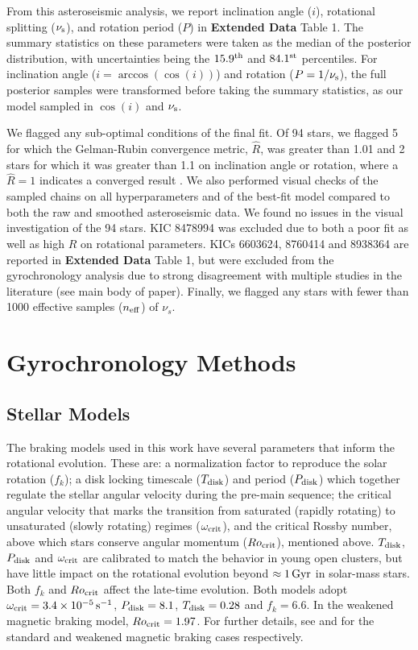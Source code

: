 From this asteroseismic analysis, we report inclination angle ($i$), rotational splitting ($\nu_{\rm s}$), and rotation period ($P$) in \textbf{Extended Data} Table 1. The summary statistics on these parameters were taken as the median of the posterior distribution, with uncertainties being the $15.9^{\rm th}$ and $84.1^{\rm st}$ percentiles. For inclination angle ($i = \arccos(\cos(i))$) and rotation ($P = 1/\nu_{\rm s}$), the full posterior samples were transformed before taking the summary statistics, as our model sampled in $\cos(i)$ and $\nu_{\rm s}$.

We flagged any sub-optimal conditions of the final fit. Of 94 stars, we flagged 5 for which the Gelman-Rubin convergence metric, $\hat{R}$, was greater than 1.01 and 2 stars for which it was greater than 1.1 on inclination angle or rotation, where a $\hat{R} = 1$ indicates a converged result \cite{gelman+rubin1992}. We also performed visual checks of the sampled chains on all hyperparameters and of the best-fit model compared to both the raw and smoothed asteroseismic data. We found no issues in the visual investigation of the 94 stars. KIC 8478994 was excluded due to both a poor fit as well as high $\hat{R}$ on rotational parameters. KICs 6603624, 8760414 and 8938364 are reported in \textbf{Extended Data} Table 1, but were excluded from the gyrochronology analysis due to strong disagreement with multiple studies in the literature (see main body of paper). Finally, we flagged any stars with fewer than 1000 effective samples ($n_{\rm eff}$) of $\nu_s$.


\section{Gyrochronology Methods}\label{s:gyro}
\subsection{Stellar Models}\label{ssec:models}
The braking models used in this work have several parameters that inform the rotational evolution. These are: a normalization factor to reproduce the solar rotation ($f_k$); a disk locking timescale ($T_{\rm disk}$) and period ($P_{\rm disk}$) which together regulate the stellar angular velocity during the pre-main sequence; the critical angular velocity that marks the transition from saturated (rapidly rotating) to unsaturated (slowly rotating) regimes ($\omega_{\rm crit}$), and the critical Rossby number, above which stars conserve angular momentum ($Ro_{\rm crit}$), mentioned above. $T_{\rm disk}$, $P_{\rm disk}$ and $\omega_{\rm crit}$ are calibrated to match the behavior in young open clusters, but have little impact on the rotational evolution beyond $\approx 1\, \rm{Gyr}$ in solar-mass stars. Both $f_k$ and $Ro_{\rm crit}$ affect the late-time evolution. Both models adopt $\omega_{\rm crit} = 3.4  \times 10^{-5}\, \rm{s}^{-1}$, $P_{\rm disk} = 8.1$, $T_{\rm disk} = 0.28$ and $f_k = 6.6$. In the weakened magnetic braking model, $Ro_{\rm crit} = 1.97$. For further details, see \cite{vansaders+pinsonneault2013} and \cite{vansaders+2016, vansaders+2019} for the standard and weakened magnetic braking cases respectively.

